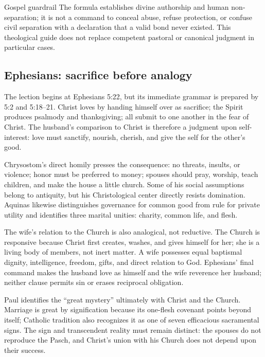 \begin{deepstudy}
\begin{studybox}{Gospel guardrail}
The formula  establishes divine authorship and human non-separation; it is not a command to conceal abuse, refuse protection, or confuse civil separation with a declaration that a valid bond never existed. This theological guide does not replace competent pastoral or canonical judgment in particular cases.
\end{studybox}

\sectionguard
\subsection*{Ephesians: sacrifice before analogy\enspace{}}

The lection begins at Ephesians 5:22, but its immediate grammar is prepared by 5:2 and 5:18--21. Christ loves by handing himself over as sacrifice; the Spirit produces psalmody and thanksgiving; all submit to one another in the fear of Christ. The husband's comparison to Christ is therefore a judgment upon self-interest: love must sanctify, nourish, cherish, and give the self for the other's good.

Chrysostom's direct homily presses the consequence: no threats, insults, or violence; honor must be preferred to money; spouses should pray, worship, teach children, and make the house a little church. Some of his social assumptions belong to antiquity, but his Christological center directly resists domination. Aquinas likewise distinguishes governance for common good from rule for private utility and identifies three marital unities: charity, common life, and flesh.

The wife's relation to the Church is also analogical, not reductive. The Church is responsive because Christ first creates, washes, and gives himself for her; she is a living body of members, not inert matter. A wife possesses equal baptismal dignity, intelligence, freedom, gifts, and direct relation to God. Ephesians' final command makes the husband love as himself and the wife reverence her husband; neither clause permits sin or erases reciprocal obligation.

\begin{sourcecard}{}
Paul identifies the ``great mystery'' ultimately with Christ and the Church. Marriage is great by signification because its one-flesh covenant points beyond itself; Catholic tradition also recognizes it as one of seven efficacious sacramental signs. The sign and transcendent reality must remain distinct: the spouses do not reproduce the Pasch, and Christ's union with his Church does not depend upon their success.
\end{sourcecard}


\end{deepstudy}
